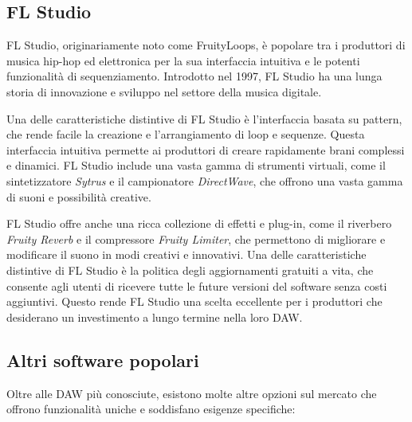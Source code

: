 \documentclass{book}
\begin{document}
\subsection{FL Studio}

FL Studio, originariamente noto come FruityLoops, è popolare tra i produttori di musica hip-hop ed elettronica per la sua interfaccia intuitiva e le potenti funzionalità di sequenziamento. Introdotto nel 1997, FL Studio ha una lunga storia di innovazione e sviluppo nel settore della musica digitale.

Una delle caratteristiche distintive di FL Studio è l’interfaccia basata su pattern, che rende facile la creazione e l’arrangiamento di loop e sequenze. Questa interfaccia intuitiva permette ai produttori di creare rapidamente brani complessi e dinamici. FL Studio include una vasta gamma di strumenti virtuali, come il sintetizzatore \textit{Sytrus} e il campionatore \textit{DirectWave}, che offrono una vasta gamma di suoni e possibilità creative.

FL Studio offre anche una ricca collezione di effetti e plug-in, come il riverbero \textit{Fruity Reverb} e il compressore \textit{Fruity Limiter}, che permettono di migliorare e modificare il suono in modi creativi e innovativi. Una delle caratteristiche distintive di FL Studio è la politica degli aggiornamenti gratuiti a vita, che consente agli utenti di ricevere tutte le future versioni del software senza costi aggiuntivi. Questo rende FL Studio una scelta eccellente per i produttori che desiderano un investimento a lungo termine nella loro DAW.

\subsection{Altri software popolari}

Oltre alle DAW più conosciute, esistono molte altre opzioni sul mercato che offrono funzionalità uniche e soddisfano esigenze specifiche:
\end{document}
